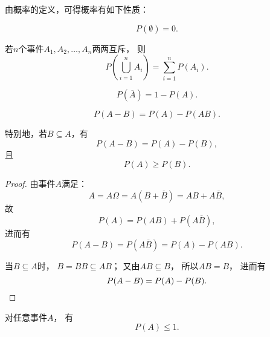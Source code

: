 由概率的定义，可得概率有如下性质：
\begin{property}
\begin{equation}
	P(\emptyset) = 0.
\end{equation}
\end{property}

\begin{property}[有限可加性]
若\(n\)个事件\(A_1,A_2,\dotsc,A_n\)两两互斥，
则\begin{equation}
	P\left(\bigcup_{i=1}^n A_i\right)
	= \sum_{i=1}^n P(A_i).
\end{equation}
\end{property}

\begin{property}
\begin{equation}
	P(\overline{A}) = 1 - P(A).
\end{equation}
\end{property}

\begin{property}[概率的减法]
\begin{equation}
	P(A - B) = P(A) - P(AB).
\end{equation}

特别地，若\(B \subseteq A\)，有
\begin{equation}
	P(A - B) = P(A) - P(B),
\end{equation}
且
\begin{equation}
	P(A) \geq P(B).
\end{equation}
\begin{proof}
由事件\(A\)满足：\begin{equation*}
	A = A \Omega
	= A(B+\overline{B})
	= AB+A\overline{B},
\end{equation*}
故\begin{equation*}
	P(A) = P(AB)+P(A\overline{B}),
\end{equation*}
进而有\begin{equation*}
	P(A-B) = P(A\overline{B}) = P(A) - P(AB).
\end{equation*}

当\(B \subseteq A\)时，
\(B = BB \subseteq AB\)；
又由\(AB \subseteq B\)，
所以\(AB = B\)，
进而有\begin{equation*}
	P(A-B) = P(A) - P(B).
	\qedhere
\end{equation*}
\end{proof}
\end{property}

\begin{property}
对任意事件\(A\)，
有\begin{equation}
	P(A) \leq 1.
\end{equation}
\end{property}

